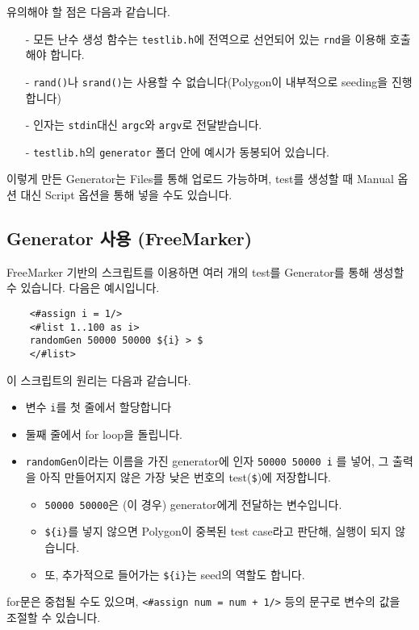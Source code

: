 \documentclass{article}
\begin{document}
    유의해야 할 점은 다음과 같습니다.
    \begin{itemize}
        \item[-] 모든 난수 생성 함수는 \verb|testlib.h|에 전역으로 선언되어 있는 \verb|rnd|을 이용해 호출해야 합니다.
        \item[-] \verb|rand()|나 \verb|srand()|는 사용할 수 없습니다(Polygon이 내부적으로 seeding을 진행합니다)
        \item[-] 인자는 \verb|stdin|대신 \verb|argc|와 \verb|argv|로 전달받습니다.
        \item[-] \verb|testlib.h|의 \verb|generator| 폴더 안에 예시가 동봉되어 있습니다.
    \end{itemize}
    이렇게 만든 Generator는 Files를 통해 업로드 가능하며, test를 생성할 때 Manual 옵션 대신 Script 옵션을 통해 넣을 수도 있습니다.
    \subsection{Generator 사용 (FreeMarker)}
    FreeMarker 기반의 스크립트를 이용하면 여러 개의 test를 Generator를 통해 생성할 수 있습니다. 다음은 예시입니다.
    \begin{verbatim}
    <#assign i = 1/>
    <#list 1..100 as i>
    randomGen 50000 50000 ${i} > $
    </#list>\end{verbatim}
    이 스크립트의 원리는 다음과 같습니다.
    \begin{itemize}
        \item 변수 \verb|i|를 첫 줄에서 할당합니다
        \item 둘째 줄에서 for loop을 돌립니다.
        \item \verb|randomGen|이라는 이름을 가진 generator에 인자 \verb|50000 50000 i| 를 넣어, 그 출력을 아직 만들어지지 않은 가장 낮은 번호의 test(\verb|$|)에 저장합니다.
        \begin{itemize}
            \item \verb|50000 50000|은 (이 경우) generator에게 전달하는 변수입니다.
            \item \verb|${i}|를 넣지 않으면 Polygon이 중복된 test case라고 판단해, 실행이 되지 않습니다.
            \item  또, 추가적으로 들어가는 \verb|${i}|는 seed의 역할도 합니다.
        \end{itemize}
    \end{itemize}
    for문은 중첩될 수도 있으며, \verb|<#assign num = num + 1/>| 등의 문구로 변수의 값을 조절할 수 있습니다.
\end{document}
